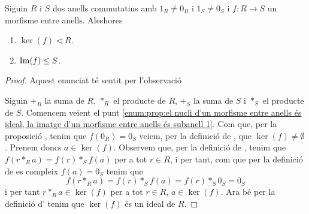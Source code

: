 \documentclass[../../Main.tex]{subfiles}
\begin{document}
	\begin{proposition}
		\label{prop:el nucli d'un morfisme entre anells és ideal, la imatge d'un morfisme entre anells és subanell}
			Siguin \(R\) i \(S\) dos anells commutatius amb \(1_{R}\neq0_{R}\) i \(1_{S}\neq0_{S}\) i \(f\colon R\longrightarrow S\) un morfisme entre anells. Aleshores
		\begin{enumerate}
			\item\label{enum:prop:el nucli d'un morfisme entre anells és ideal, la imatge d'un morfisme entre anells és subanell 1} \(\ker(f)\triangleleft R\).
			\item\label{enum:prop:el nucli d'un morfisme entre anells és ideal, la imatge d'un morfisme entre anells és subanell 2} \(\operatorname{Im}(f)\leq S\).
		\end{enumerate}
		\begin{proof}
			Aquest enunciat té sentit per l'observació 
			
			Siguin \(+_{R}\) la suma de \(R\), \(\ast_{R}\) el producte de \(R\), \(+_{S}\) la suma de \(S\) i \(\ast_{S}\) el producte de \(S\). Comencem veient el punt \eqref{enum:prop:el nucli d'un morfisme entre anells és ideal, la imatge d'un morfisme entre anells és subanell 1}. Com que, per la proposició , tenim que \(f(0_{R})=0_{S}\) veiem, per la definició de , que \(\ker(f)\neq\emptyset\). Prenem doncs \(a\in\ker(f)\). Observem que, per la definició de , tenim que \(f(r\ast_{R}a)=f(r)\ast_{S}f(a)\) per a tot \(r\in R\), i per tant, com que per la definició de  es compleix \(f(a)=0_{S}\) tenim que \[f(r\ast_{R}a)=f(r)\ast_{S}f(a)=f(r)\ast_{S}0_{S}=0_{S}\]
			i per tant \(r\ast_{R}a\in\ker(f)\) per a tot \(r\in R\), \(a\in\ker(f)\). Ara bé per la definició d' tenim que \(\ker(f)\) és un ideal de \(R\).
			

\end{proof}
\end{proposition}
\end{document}
